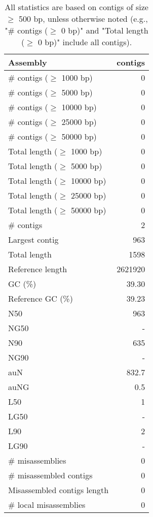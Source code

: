 \documentclass[12pt,a4paper]{article}
\begin{document}
\begin{table}[ht]
\begin{center}
\caption{All statistics are based on contigs of size $\geq$ 500 bp, unless otherwise noted (e.g., "\# contigs ($\geq$ 0 bp)" and "Total length ($\geq$ 0 bp)" include all contigs).}
\begin{tabular}{|l*{1}{|r}|}
\hline
Assembly & contigs \\ \hline
\# contigs ($\geq$ 1000 bp) & 0 \\ \hline
\# contigs ($\geq$ 5000 bp) & 0 \\ \hline
\# contigs ($\geq$ 10000 bp) & 0 \\ \hline
\# contigs ($\geq$ 25000 bp) & 0 \\ \hline
\# contigs ($\geq$ 50000 bp) & 0 \\ \hline
Total length ($\geq$ 1000 bp) & 0 \\ \hline
Total length ($\geq$ 5000 bp) & 0 \\ \hline
Total length ($\geq$ 10000 bp) & 0 \\ \hline
Total length ($\geq$ 25000 bp) & 0 \\ \hline
Total length ($\geq$ 50000 bp) & 0 \\ \hline
\# contigs & 2 \\ \hline
Largest contig & 963 \\ \hline
Total length & 1598 \\ \hline
Reference length & 2621920 \\ \hline
GC (\%) & 39.30 \\ \hline
Reference GC (\%) & 39.23 \\ \hline
N50 & 963 \\ \hline
NG50 & - \\ \hline
N90 & 635 \\ \hline
NG90 & - \\ \hline
auN & 832.7 \\ \hline
auNG & 0.5 \\ \hline
L50 & 1 \\ \hline
LG50 & - \\ \hline
L90 & 2 \\ \hline
LG90 & - \\ \hline
\# misassemblies & 0 \\ \hline
\# misassembled contigs & 0 \\ \hline
Misassembled contigs length & 0 \\ \hline
\# local misassemblies & 0 \\ \hline

\end{tabular}
\end{center}
\end{table}
\end{document}
